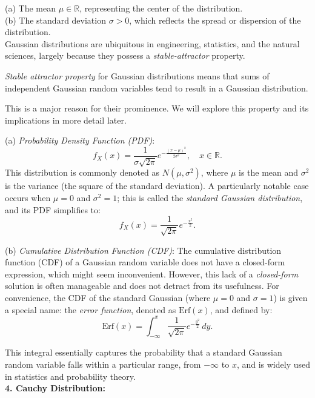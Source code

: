 (a) The mean \(\mu \in \mathbb{R}\), representing the center of the distribution.\\
(b) The standard deviation \(\sigma > 0\), which reflects the spread or dispersion of the distribution.\\

Gaussian distributions are ubiquitous in engineering, statistics, and the natural sciences, largely because they possess a \textit{stable-attractor} property. 

\begin{definition}
    \textit{Stable attractor property} for Gaussian distributions means that sums of independent Gaussian random variables tend to result in a Gaussian distribution.
\end{definition}

This is a major reason for their prominence. We will explore this property and its implications in more detail later.

(a) \textit{Probability Density Function (PDF)}: 
\[
f_X(x) = \frac{1}{\sigma \sqrt{2\pi}} e^{-\frac{(x - \mu)^2}{2\sigma^2}}, \quad x \in \mathbb{R}.
\]
This distribution is commonly denoted as \(N(\mu, \sigma^2)\), where \(\mu\) is the mean and \(\sigma^2\) is the variance (the square of the standard deviation). A particularly notable case occurs when \(\mu = 0\) and \(\sigma^2 = 1\); this is called the \textit{standard Gaussian distribution}, and its PDF simplifies to:
\[
f_X(x) = \frac{1}{\sqrt{2\pi}} e^{-\frac{x^2}{2}}.
\]

(b) \textit{Cumulative Distribution Function (CDF)}: The cumulative distribution function (CDF) of a Gaussian random variable does not have a closed-form expression, which might seem inconvenient. However, this lack of a \textit{closed-form} solution is often manageable and does not detract from its usefulness. For convenience, the CDF of the standard Gaussian (where \(\mu = 0\) and \(\sigma = 1\)) is given a special name: the \textit{error function}, denoted as \(\text{Erf}(x)\), and defined by:
\[
\text{Erf}(x) = \int_{-\infty}^{x} \frac{1}{\sqrt{2\pi}} e^{-\frac{y^2}{2}} \, dy.
\]

This integral essentially captures the probability that a standard Gaussian random variable falls within a particular range, from \(-\infty\) to \(x\), and is widely used in statistics and probability theory.\\

\textbf{4. Cauchy Distribution:} \\

